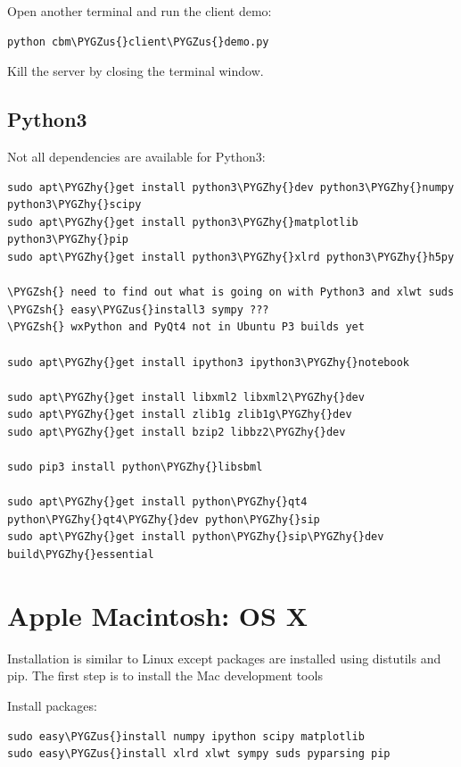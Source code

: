 \documentclass[a4paper,11pt,english]{sphinxmanual}
\def\PYGZus{\char`\_}
\def\PYGZsh{\char`\#}
\def\PYGZhy{\char`\-}
\begin{document}
Open another terminal and run the client demo:

\begin{Verbatim}[commandchars=\\\{\}]
python cbm\PYGZus{}client\PYGZus{}demo.py
\end{Verbatim}

Kill the server by closing the terminal window.


\subsection{Python3}
\label{install_doc:python3}
Not all dependencies are available for Python3:

\begin{Verbatim}[commandchars=\\\{\}]
sudo apt\PYGZhy{}get install python3\PYGZhy{}dev python3\PYGZhy{}numpy python3\PYGZhy{}scipy
sudo apt\PYGZhy{}get install python3\PYGZhy{}matplotlib  python3\PYGZhy{}pip
sudo apt\PYGZhy{}get install python3\PYGZhy{}xlrd python3\PYGZhy{}h5py

\PYGZsh{} need to find out what is going on with Python3 and xlwt suds
\PYGZsh{} easy\PYGZus{}install3 sympy ???
\PYGZsh{} wxPython and PyQt4 not in Ubuntu P3 builds yet

sudo apt\PYGZhy{}get install ipython3 ipython3\PYGZhy{}notebook

sudo apt\PYGZhy{}get install libxml2 libxml2\PYGZhy{}dev
sudo apt\PYGZhy{}get install zlib1g zlib1g\PYGZhy{}dev
sudo apt\PYGZhy{}get install bzip2 libbz2\PYGZhy{}dev

sudo pip3 install python\PYGZhy{}libsbml

sudo apt\PYGZhy{}get install python\PYGZhy{}qt4 python\PYGZhy{}qt4\PYGZhy{}dev python\PYGZhy{}sip
sudo apt\PYGZhy{}get install python\PYGZhy{}sip\PYGZhy{}dev build\PYGZhy{}essential
\end{Verbatim}


\section{Apple Macintosh: OS X}
\label{install_doc:apple-macintosh-os-x}
Installation is similar to Linux except packages are installed using distutils and pip. The first step is to install the Mac development tools 

Install  packages:

\begin{Verbatim}[commandchars=\\\{\}]
sudo easy\PYGZus{}install numpy ipython scipy matplotlib
sudo easy\PYGZus{}install xlrd xlwt sympy suds pyparsing pip
\end{Verbatim}
\end{document}
